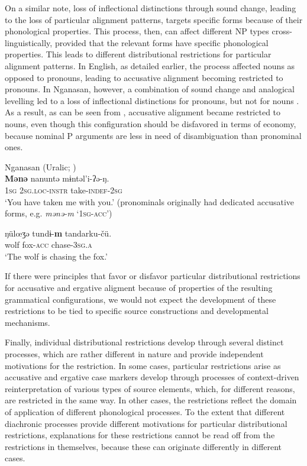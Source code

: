 \documentclass[output=paper]{langsci/langscibook}
\begin{document}
\z

On a similar note, loss of inflectional distinctions through sound
change,
leading to the loss of particular alignment patterns, targets specific
forms because of their phonological properties. This process, then, can affect different NP types cross-linguistically,
provided that the relevant forms have specific phonological
properties. This leads to different distributional
restrictions for particular alignment patterns. In English, as
detailed earlier, the process affected nouns as
opposed to pronouns, leading to accusative alignment becoming
restricted to pronouns. In  Nganasan, however, a combination of sound change and
analogical levelling led to a  loss of inflectional
distinctions for pronouns, but not for nouns
. As a result, as can be seen from
, accusative alignment became
restricted to nouns, even though this configuration should be
disfavored in terms of economy, because nominal P arguments are less in need
of disambiguation than pronominal ones.

\ea\label{nganasan}
Nganasan (Uralic; )\\
  \ea
    \gll \textbf{{Mənə}} nanuntə m​ɨntəl'i-ʔə-ŋ.\\
    1\textsc{sg} 2\textsc{sg.loc-instr} take-\textsc{indef}-2\textsc{sg}\\
    \glt `You have taken me with you.' (pronominals originally had dedicated accusative forms, e.g. {\em mənə-m} `1\textsc{sg-acc}')
    
  \ex
    \gll ŋül{\oe}ʒə tund​ɨ-\textbf{{m}} tandarku-čü.\\
    wolf fox-\textsc{acc} chase-3\textsc{sg.a}\\
    \glt `The wolf is chasing the fox.'
    
  \z
\z

If there were principles that favor or disfavor particular distributional
restrictions for accusative and ergative aligment because of properties of the
resulting grammatical configurations, we would not expect the development of
these restrictions to be tied to specific source
constructions and developmental mechanisms. 

Finally, individual distributional restrictions develop through several distinct
processes, which are rather different in nature and provide
independent motivations for the restriction. In some cases, particular
restrictions arise as accusative and ergative case markers develop
through processes of context-driven reinterpretation of various types
of source elements, which, for different reasons, are restricted in the same way. In other cases, the restrictions reflect the domain of
application of different phonological processes. To the extent that different diachronic processes provide different
motivations for particular distributional restrictions, 
explanations for these restrictions cannot be read off from the
restrictions in themselves, because these can originate differently in
different cases.
\end{document}
